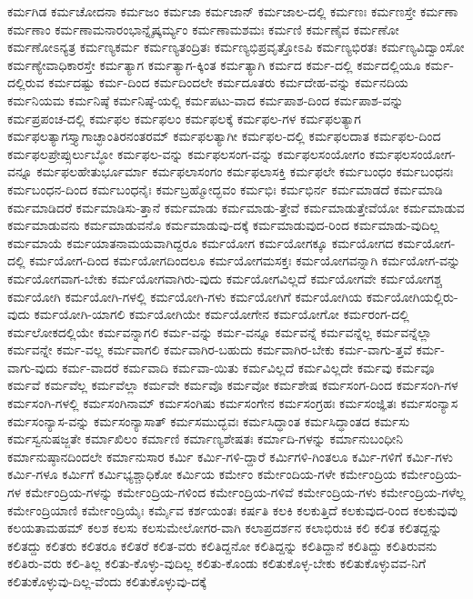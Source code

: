 {ಕರ್ಮಗಿಡ
ಕರ್ಮಚೋದನಾ
ಕರ್ಮಜಂ
ಕರ್ಮಜಾ
ಕರ್ಮಜಾನ್
ಕರ್ಮಜಾಲ-ದಲ್ಲಿ
ಕರ್ಮಣಃ
ಕರ್ಮಣಸ್ತೇ
ಕರ್ಮಣಾ
ಕರ್ಮಣಾಂ
ಕರ್ಮಣಾಮನಾರಂಭಾನ್ನೈಷ್ಕರ್ಮ್ಯಂ
ಕರ್ಮಣಾಮಶಮಃ
ಕರ್ಮಣಿ
ಕರ್ಮಣೈವ
ಕರ್ಮಣೋ
ಕರ್ಮಣೋಽನ್ಯತ್ರ
ಕರ್ಮಣ್ಯಕರ್ಮ
ಕರ್ಮಣ್ಯತಂದ್ರಿತಃ
ಕರ್ಮಣ್ಯಭಿಪ್ರವೃತ್ತೋಽಪಿ
ಕರ್ಮಣ್ಯಭಿರತಃ
ಕರ್ಮಣ್ಯವಿದ್ವಾಂಸೋ
ಕರ್ಮಣ್ಯೇವಾಧಿಕಾರಸ್ತೇ
ಕರ್ಮತ್ಯಾಗ
ಕರ್ಮತ್ಯಾಗ-ಕ್ಕಿಂತ
ಕರ್ಮತ್ಯಾಗಿ
ಕರ್ಮದ
ಕರ್ಮ-ದಲ್ಲಿ
ಕರ್ಮದಲ್ಲಿಯೂ
ಕರ್ಮ-ದಲ್ಲಿರುವ
ಕರ್ಮದಷ್ಟು
ಕರ್ಮ-ದಿಂದ
ಕರ್ಮದಿಂದಲೇ
ಕರ್ಮದೂತರು
ಕರ್ಮದೇಹ-ವನ್ನು
ಕರ್ಮನದಿಯ
ಕರ್ಮನಿಯಮ
ಕರ್ಮನಿಷ್ಠೆ
ಕರ್ಮನಿಷ್ಠೆ-ಯಲ್ಲಿ
ಕರ್ಮಪಟು-ವಾದ
ಕರ್ಮಪಾಶ-ದಿಂದ
ಕರ್ಮಪಾಶ-ವನ್ನು
ಕರ್ಮಪ್ರಪಂಚ-ದಲ್ಲಿ
ಕರ್ಮಫಲ
ಕರ್ಮಫಲಂ
ಕರ್ಮಫಲಕ್ಕೆ
ಕರ್ಮಫಲ-ಗಳ
ಕರ್ಮಫಲತ್ಯಾಗ
ಕರ್ಮಫಲತ್ಯಾಗಸ್ತ್ಯಾಗಾಚ್ಛಾಂತಿರನಂತರಮ್
ಕರ್ಮಫಲತ್ಯಾಗೀ
ಕರ್ಮಫಲ-ದಲ್ಲಿ
ಕರ್ಮಫಲದಾತ
ಕರ್ಮಫಲ-ದಿಂದ
ಕರ್ಮಫಲಪ್ರೇಪ್ಸುರ್ಲುಬ್ಧೋ
ಕರ್ಮಫಲ-ವನ್ನು
ಕರ್ಮಫಲಸಂಗ-ವನ್ನು
ಕರ್ಮಫಲಸಂಯೋಗಂ
ಕರ್ಮಫಲಸಂಯೋಗ-ವನ್ನೂ
ಕರ್ಮಫಲಹೇತುರ್ಭೂರ್ಮಾ
ಕರ್ಮಫಲಾಸಂಗಂ
ಕರ್ಮಫಲಾಸಕ್ತಿ
ಕರ್ಮಫಲೇ
ಕರ್ಮಬಂಧಂ
ಕರ್ಮಬಂಧನಃ
ಕರ್ಮಬಂಧನ-ದಿಂದ
ಕರ್ಮಬಂಧನೈಃ
ಕರ್ಮಬ್ರಹ್ಮೋದ್ಭವಂ
ಕರ್ಮಭಿಃ
ಕರ್ಮಭಿರ್ನ
ಕರ್ಮಮಾಡದೆ
ಕರ್ಮಮಾಡಿ
ಕರ್ಮಮಾಡಿದರೆ
ಕರ್ಮಮಾಡಿಸು-ತ್ತಾನೆ
ಕರ್ಮಮಾಡು
ಕರ್ಮಮಾಡು-ತ್ತೇವೆ
ಕರ್ಮಮಾಡುತ್ತೇವೆಯೋ
ಕರ್ಮಮಾಡುವ
ಕರ್ಮಮಾಡುವನು
ಕರ್ಮಮಾಡುವನೊ
ಕರ್ಮಮಾಡುವು-ದಕ್ಕೆ
ಕರ್ಮಮಾಡುವುದ-ರಿಂದ
ಕರ್ಮಮಾಡು-ವುದಿಲ್ಲ
ಕರ್ಮಮಾಯೆ
ಕರ್ಮಯಾತನಾಮಯವಾಗಿದ್ದರೂ
ಕರ್ಮಯೋಗ
ಕರ್ಮಯೋಗಕ್ಕೂ
ಕರ್ಮಯೋಗದ
ಕರ್ಮಯೋಗ-ದಲ್ಲಿ
ಕರ್ಮಯೋಗ-ದಿಂದ
ಕರ್ಮಯೋಗದಿಂದಲೂ
ಕರ್ಮಯೋಗಮಸಕ್ತಃ
ಕರ್ಮಯೋಗವನ್ನಾಗಿ
ಕರ್ಮಯೋಗ-ವನ್ನು
ಕರ್ಮಯೋಗವಾಗ-ಬೇಕು
ಕರ್ಮಯೋಗವಾಗಿರು-ವುದು
ಕರ್ಮಯೋಗವಿಲ್ಲದೆ
ಕರ್ಮಯೋಗವೇ
ಕರ್ಮಯೋಗಶ್ಚ
ಕರ್ಮಯೋಗಿ
ಕರ್ಮಯೋಗಿ-ಗಳಲ್ಲಿ
ಕರ್ಮಯೋಗಿ-ಗಳು
ಕರ್ಮಯೋಗಿಗೆ
ಕರ್ಮಯೋಗಿಯ
ಕರ್ಮಯೋಗಿಯಲ್ಲಿರು-ವುದು
ಕರ್ಮಯೋಗಿ-ಯಾಗಲಿ
ಕರ್ಮಯೋಗಿಯೇ
ಕರ್ಮಯೋಗೇನ
ಕರ್ಮಯೋಗೋ
ಕರ್ಮರಂಗ-ದಲ್ಲಿ
ಕರ್ಮಲೋಕದಲ್ಲಿಯೇ
ಕರ್ಮವನ್ನಾಗಲಿ
ಕರ್ಮ-ವನ್ನು
ಕರ್ಮ-ವನ್ನೂ
ಕರ್ಮವನ್ನೆ
ಕರ್ಮವನ್ನೆಲ್ಲ
ಕರ್ಮವನ್ನೆಲ್ಲಾ
ಕರ್ಮವನ್ನೇ
ಕರ್ಮ-ವಲ್ಲ
ಕರ್ಮವಾಗಲಿ
ಕರ್ಮವಾಗಿರ-ಬಹುದು
ಕರ್ಮವಾಗಿರ-ಬೇಕು
ಕರ್ಮ-ವಾಗು-ತ್ತವೆ
ಕರ್ಮ-ವಾಗು-ವುದು
ಕರ್ಮ-ವಾದರೆ
ಕರ್ಮವಾದಿ
ಕರ್ಮವಾ-ಯಿತು
ಕರ್ಮವಿಲ್ಲದೆ
ಕರ್ಮವಿಲ್ಲದೇ
ಕರ್ಮವು
ಕರ್ಮವೂ
ಕರ್ಮವೆ
ಕರ್ಮವೆಲ್ಲ
ಕರ್ಮವೆಲ್ಲಾ
ಕರ್ಮವೇ
ಕರ್ಮವೊ
ಕರ್ಮವೋ
ಕರ್ಮಶೇಷ
ಕರ್ಮಸಂಗ-ದಿಂದ
ಕರ್ಮಸಂಗಿ-ಗಳ
ಕರ್ಮಸಂಗಿ-ಗಳಲ್ಲಿ
ಕರ್ಮಸಂಗಿನಾಮ್
ಕರ್ಮಸಂಗಿಷು
ಕರ್ಮಸಂಗೇನ
ಕರ್ಮಸಂಗ್ರಹಃ
ಕರ್ಮಸಂಜ್ಞಿತಃ
ಕರ್ಮಸಂನ್ಯಾಸ
ಕರ್ಮಸಂನ್ಯಾಸ-ವನ್ನು
ಕರ್ಮಸಂನ್ಯಾಸಾತ್
ಕರ್ಮಸಮುದ್ಭವಃ
ಕರ್ಮಸಿದ್ಧಾಂತ
ಕರ್ಮಸಿದ್ಧಾಂತದ
ಕರ್ಮಸು
ಕರ್ಮಸ್ವನುಷಜ್ಜತೇ
ಕರ್ಮಾಖಿಲಂ
ಕರ್ಮಾಣಿ
ಕರ್ಮಾಣ್ಯಶೇಷತಃ
ಕರ್ಮಾದಿ-ಗಳನ್ನು
ಕರ್ಮಾನುಬಂಧೀನಿ
ಕರ್ಮಾನುಷ್ಠಾನದಿಂದಲೇ
ಕರ್ಮಾನುಸಾರ
ಕರ್ಮಿ
ಕರ್ಮಿ-ಗಳಿ-ದ್ದಾರೆ
ಕರ್ಮಿಗಳಿ-ಗಿಂತಲೂ
ಕರ್ಮಿ-ಗಳಿಗೆ
ಕರ್ಮಿ-ಗಳು
ಕರ್ಮಿ-ಗಳೂ
ಕರ್ಮಿಗೆ
ಕರ್ಮಿಭ್ಯಶ್ಚಾಧಿಕೋ
ಕರ್ಮಿಯ
ಕರ್ಮೇಂ
ಕರ್ಮೇಂದಿಯ-ಗಳೇ
ಕರ್ಮೇಂದ್ರಿಯ
ಕರ್ಮೇಂದ್ರಿಯ-ಗಳ
ಕರ್ಮೇಂದ್ರಿಯ-ಗಳನ್ನು
ಕರ್ಮೇಂದ್ರಿಯ-ಗಳಿಂದ
ಕರ್ಮೇಂದ್ರಿಯ-ಗಳಿವೆ
ಕರ್ಮೇಂದ್ರಿಯ-ಗಳು
ಕರ್ಮೇಂದ್ರಿಯ-ಗಳೆಲ್ಲ
ಕರ್ಮೇಂದ್ರಿಯಾಣಿ
ಕರ್ಮೇಂದ್ರಿಯೈಃ
ಕರ್ಮೈವ
ಕರ್ಶಯಂತಃ
ಕರ್ಷತಿ
ಕಲಕಿ
ಕಲಕುತ್ತಿದೆ
ಕಲಕುವುದ-ರಿಂದ
ಕಲಕುವುವು
ಕಲಯತಾಮಹಮ್
ಕಲಶ
ಕಲಸು
ಕಲಸುಮೇಲೋಗರ-ವಾಗಿ
ಕಲಾಪ್ರದರ್ಶನ
ಕಲಾಭಿರುಚಿ
ಕಲಿ
ಕಲಿತ
ಕಲಿತದ್ದನ್ನು
ಕಲಿತದ್ದು
ಕಲಿತರು
ಕಲಿತರೂ
ಕಲಿತರೆ
ಕಲಿತ-ವರು
ಕಲಿತಿದ್ದನೋ
ಕಲಿತಿದ್ದನ್ನು
ಕಲಿತಿದ್ದಾನೆ
ಕಲಿತಿದ್ದು
ಕಲಿತಿರುವನು
ಕಲಿತಿರು-ವರು
ಕಲಿ-ತಿಲ್ಲ
ಕಲಿತು-ಕೊಳ್ಳು-ವುದಿಲ್ಲ
ಕಲಿತು-ಕೊಂಡು
ಕಲಿತುಕೊಳ್ಳ-ಬೇಕು
ಕಲಿತುಕೊಳ್ಳುವವ-ನಿಗೆ
ಕಲಿತುಕೊಳ್ಳುವು-ದಿಲ್ಲ-ವೆಂದು
ಕಲಿತುಕೊಳ್ಳುವು-ದಕ್ಕೆ
}
